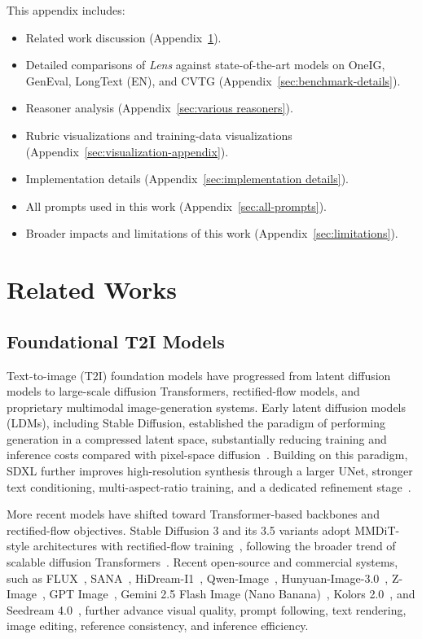 \documentclass{llmxive}
\begin{document}
This appendix includes: 
\begin{itemize}
    \item Related work discussion (Appendix~\ref{sec:related works}).
    \item Detailed comparisons of \textit{Lens} against state-of-the-art models on OneIG, GenEval, LongText (EN), and CVTG (Appendix~\ref{sec:benchmark-details}).
    \item Reasoner analysis (Appendix~\ref{sec:various reasoners}).
    \item Rubric visualizations and training-data visualizations (Appendix~\ref{sec:visualization-appendix}).
    \item Implementation details (Appendix~\ref{sec:implementation details}).
    \item All prompts used in this work (Appendix~\ref{sec:all-prompts}).
    \item Broader impacts and limitations of this work (Appendix~\ref{sec:limitations}).
\end{itemize}


\section{Related Works}
\label{sec:related works}

\subsection{Foundational T2I Models}
Text-to-image (T2I) foundation models have progressed from latent diffusion models to large-scale diffusion Transformers, rectified-flow models, and proprietary multimodal image-generation systems. Early latent diffusion models (LDMs), including Stable Diffusion, established the paradigm of performing generation in a compressed latent space, substantially reducing training and inference costs compared with pixel-space diffusion~\citep{rombach2022high}. Building on this paradigm, SDXL further improves high-resolution synthesis through a larger UNet, stronger text conditioning, multi-aspect-ratio training, and a dedicated refinement stage~\citep{podell2024sdxl}.

More recent models have shifted toward Transformer-based backbones and rectified-flow objectives. Stable Diffusion 3 and its 3.5 variants adopt MMDiT-style architectures with rectified-flow training~\citep{esser2024scaling,stabilityai2024sd35}, following the broader trend of scalable diffusion Transformers~\citep{peebles2023scalable}. Recent open-source and commercial systems, such as FLUX~\citep{flux2024}, SANA~\citep{xie2024sana}, HiDream-I1~\citep{cai2025hidream}, Qwen-Image~\citep{wu2025qwenimage}, Hunyuan-Image-3.0~\citep{cao2025hunyuanimage}, Z-Image~\citep{cai2025zimage}, GPT Image~\citep{openai2025gptimage}, Gemini 2.5 Flash Image (Nano Banana)~\citep{google2025nanobanana}, Kolors 2.0~\citep{kolors2}, and Seedream 4.0~\citep{seedream2025seedream4}, further advance visual quality, prompt following, text rendering, image editing, reference consistency, and inference efficiency.
\end{document}
